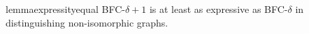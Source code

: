 

\begin{restatable}[]{lemma}{expressityequal}
\label{lemma:bfc_equal}
BFC-${\delta+1}$ is at least as expressive as BFC-${\delta}$ in distinguishing non-isomorphic graphs.
\end{restatable}

